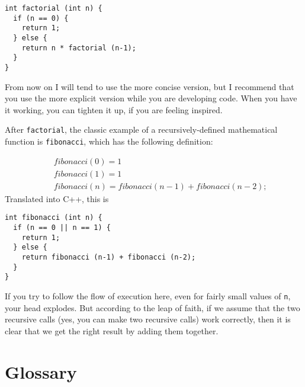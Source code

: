 \begin{verbatim}
int factorial (int n) {
  if (n == 0) {
    return 1;
  } else {
    return n * factorial (n-1);
  }
}
\end{verbatim}
%
From now on I will tend to use the more concise version, but
I recommend that you use the more explicit version while you
are developing code.   When you have it working, you can
tighten it up, if you are feeling inspired.

After {\tt factorial}, the classic example of a recursively-defined
mathematical function is {\tt fibonacci}, which has the
following definition:

\begin{eqnarray*}
&& fibonacci(0) = 1 \\
&& fibonacci(1) = 1 \\
&& fibonacci(n) = fibonacci(n-1) + fibonacci(n-2);
\end{eqnarray*}
%
Translated into C++, this is

\begin{verbatim}
int fibonacci (int n) {
  if (n == 0 || n == 1) {
    return 1;
  } else {
    return fibonacci (n-1) + fibonacci (n-2);
  }
}
\end{verbatim}
%
If you try to follow the flow of execution here, even for fairly small
values of {\tt n}, your head explodes.  But according to the leap of
faith, if we assume that the two recursive calls (yes, you can make
two recursive calls) work correctly, then it is clear that we get the
right result by adding them together.

\section{Glossary}

